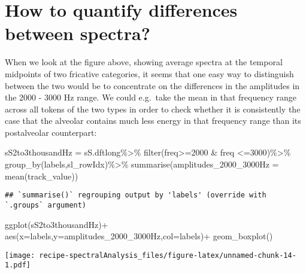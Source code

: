 \documentclass[
]{book}
\newenvironment{Shaded}{\begin{snugshade}}{\end{snugshade}}
\newcommand{\AttributeTok}[1]{\textcolor[rgb]{0.77,0.63,0.00}{#1}}
\newcommand{\DecValTok}[1]{\textcolor[rgb]{0.00,0.00,0.81}{#1}}
\newcommand{\FunctionTok}[1]{\textcolor[rgb]{0.00,0.00,0.00}{#1}}
\newcommand{\NormalTok}[1]{#1}
\newcommand{\OtherTok}[1]{\textcolor[rgb]{0.56,0.35,0.01}{#1}}
\newcommand{\SpecialCharTok}[1]{\textcolor[rgb]{0.00,0.00,0.00}{#1}}
\begin{document}
\hypertarget{how-to-quantify-differences-between-spectra}{%
\section{How to quantify differences between spectra?}\label{how-to-quantify-differences-between-spectra}}

When we look at the figure above, showing average spectra at the temporal midpoints of two fricative categories, it seems that one easy way to distinguish between the two would be to concentrate on the differences in the amplitudes in the 2000 - 3000 Hz range. We could e.g.~take the mean in that frequency range across all tokens of the two types in order to check whether it is consistently the case that the alveolar contains much less energy in that frequency range than its postalveolar counterpart:

\begin{Shaded}
\begin{Highlighting}[]
\NormalTok{sS2to3thousandHz }\OtherTok{=}\NormalTok{ sS.dftlong}\SpecialCharTok{\%\textgreater{}\%}
  \FunctionTok{filter}\NormalTok{(freq}\SpecialCharTok{\textgreater{}=}\DecValTok{2000} \SpecialCharTok{\&}\NormalTok{ freq }\SpecialCharTok{\textless{}=}\DecValTok{3000}\NormalTok{)}\SpecialCharTok{\%\textgreater{}\%}
  \FunctionTok{group\_by}\NormalTok{(labels,sl\_rowIdx)}\SpecialCharTok{\%\textgreater{}\%}
  \FunctionTok{summarise}\NormalTok{(}\AttributeTok{amplitudes\_2000\_3000Hz =} \FunctionTok{mean}\NormalTok{(track\_value))}
\end{Highlighting}
\end{Shaded}

\begin{verbatim}
## `summarise()` regrouping output by 'labels' (override with `.groups` argument)
\end{verbatim}

\begin{Shaded}
\begin{Highlighting}[]
\FunctionTok{ggplot}\NormalTok{(sS2to3thousandHz)}\SpecialCharTok{+}
  \FunctionTok{aes}\NormalTok{(}\AttributeTok{x=}\NormalTok{labels,}\AttributeTok{y=}\NormalTok{amplitudes\_2000\_3000Hz,}\AttributeTok{col=}\NormalTok{labels)}\SpecialCharTok{+}
  \FunctionTok{geom\_boxplot}\NormalTok{()}
\end{Highlighting}
\end{Shaded}

\texttt{[image: recipe-spectralAnalysis\_files/figure-latex/unnamed-chunk-14-1.pdf]}
\end{document}
